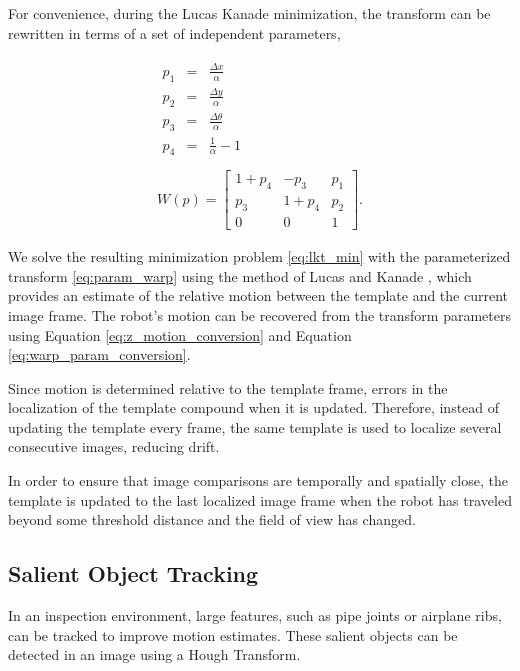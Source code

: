 \documentclass[letterpaper, 10 pt, conference]{ieeeconf}
\begin{document}
For convenience, during the Lucas Kanade minimization, the transform can be rewritten in terms of a set of independent parameters,

\begin{eqnarray}
\begin{split} \label{eq:warp_param_conversion}
p_1 &=& \frac{\Delta x}{\alpha}\\
p_2 &=& \frac{\Delta y}{\alpha}\\
p_3 &=& \frac{\Delta \theta}{\alpha}\\
p_4 &=& \frac{1}{\alpha} - 1\\
\end{split}
\\ \label{eq:param_warp}
W(p) = \begin{bmatrix} 1+p_4 & -p_3 & p_1 \\ p_3 & 1+p_4 & p_2 \\ 0 & 0 & 1 \end{bmatrix}.
\end{eqnarray}

We solve the resulting minimization problem \eqref{eq:lkt_min} with the parameterized transform \eqref{eq:param_warp} using the method of Lucas and Kanade \cite{Lucas81, lucaskanade}, which provides an estimate of the relative motion between the template and the current image frame. The robot's motion can be recovered from the transform parameters using Equation \eqref{eq:z_motion_conversion} and Equation \eqref{eq:warp_param_conversion}.

Since motion is determined relative to the template frame, errors in the localization of the template compound when it is updated. Therefore, instead of updating the template every frame, the same template is used to localize several consecutive images, reducing drift.

In order to ensure that image comparisons are temporally and spatially close, the template is updated to the last localized image frame when the robot has traveled beyond some threshold distance and the field of view has changed.

\subsection{Salient Object Tracking}

In an inspection environment, large features, such as pipe joints or airplane ribs, can be tracked to improve motion estimates. These salient objects can be detected in an image using a Hough Transform.
\end{document}
